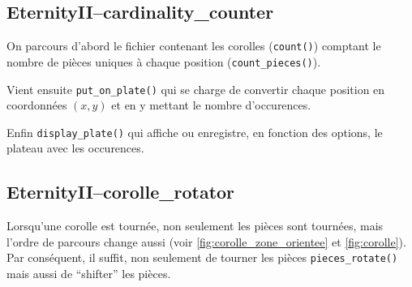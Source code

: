 	\subsection{EternityII--cardinality\_counter} 
	
On parcours d'abord le fichier contenant les corolles (\lstinline[language=python]|count()|) comptant le nombre de pièces uniques à chaque position (\lstinline[language=python]|count_pieces()|).

Vient ensuite \lstinline[language=python]|put_on_plate()| qui se charge de convertir chaque position en coordonnées $(x,y)$ et en y mettant le nombre d'occurences.

Enfin \lstinline[language=python]|display_plate()| qui affiche ou enregistre, en fonction des options, le plateau avec les occurences.

	\subsection{EternityII--corolle\_rotator}
	
Lorsqu'une corolle est tournée, non seulement les pièces sont tournées, mais l'ordre de parcours change aussi (voir \autoref{fig:corolle_zone_orientee} et \autoref{fig:corolle}). Par conséquent, il suffit, non seulement de tourner les pièces \lstinline[language=python]|pieces_rotate()| mais aussi de \enquote{shifter} les pièces.

